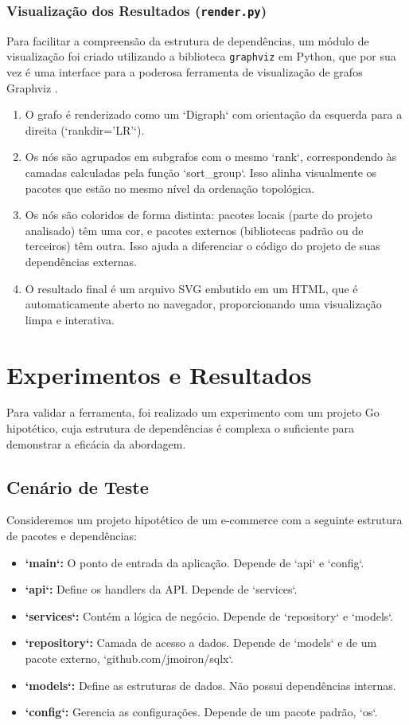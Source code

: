 \documentclass[12pt]{article}
\begin{document}
\subsubsection{Visualização dos Resultados (\texttt{render.py})}

Para facilitar a compreensão da estrutura de dependências, um módulo de visualização foi criado utilizando a biblioteca \texttt{graphviz} em Python, que por sua vez é uma interface para a poderosa ferramenta de visualização de grafos Graphviz \cite{graphviz}.

\begin{enumerate}
    \item O grafo é renderizado como um `Digraph` com orientação da esquerda para a direita (`rankdir='LR'`).
    \item Os nós são agrupados em subgrafos com o mesmo `rank`, correspondendo às camadas calculadas pela função `sort\_group`. Isso alinha visualmente os pacotes que estão no mesmo nível da ordenação topológica.
    \item Os nós são coloridos de forma distinta: pacotes locais (parte do projeto analisado) têm uma cor, e pacotes externos (bibliotecas padrão ou de terceiros) têm outra. Isso ajuda a diferenciar o código do projeto de suas dependências externas.
    \item O resultado final é um arquivo SVG embutido em um HTML, que é automaticamente aberto no navegador, proporcionando uma visualização limpa e interativa.
\end{enumerate}

\section{Experimentos e Resultados}
Para validar a ferramenta, foi realizado um experimento com um projeto Go hipotético, cuja estrutura de dependências é complexa o suficiente para demonstrar a eficácia da abordagem.

\subsection{Cenário de Teste}
Consideremos um projeto hipotético de um e-commerce com a seguinte estrutura de pacotes e dependências:

\begin{itemize}
    \item \textbf{`main`:} O ponto de entrada da aplicação. Depende de `api` e `config`.
    \item \textbf{`api`:} Define os handlers da API. Depende de `services`.
    \item \textbf{`services`:} Contém a lógica de negócio. Depende de `repository` e `models`.
    \item \textbf{`repository`:} Camada de acesso a dados. Depende de `models` e de um pacote externo, `github.com/jmoiron/sqlx`.
    \item \textbf{`models`:} Define as estruturas de dados. Não possui dependências internas.
    \item \textbf{`config`:} Gerencia as configurações. Depende de um pacote padrão, `os`.
\end{itemize}
\end{document}
